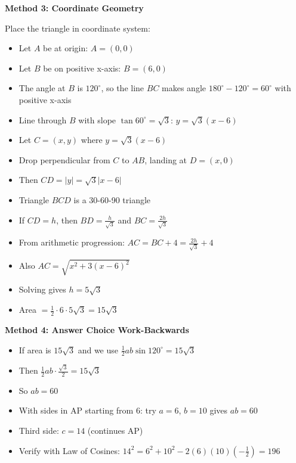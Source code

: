 \documentclass[12pt]{article}
\begin{document}
\begin{solutionbox}
\textbf{Method 3: Coordinate Geometry}

Place the triangle in coordinate system:
\begin{itemize}
    \item Let $A$ be at origin: $A = (0, 0)$
    \item Let $B$ be on positive x-axis: $B = (6, 0)$
    \item The angle at $B$ is $120^\circ$, so the line $BC$ makes angle $180^\circ - 120^\circ = 60^\circ$ with positive x-axis
    \item Line through $B$ with slope $\tan 60^\circ = \sqrt{3}$: $y = \sqrt{3}(x - 6)$
    \item Let $C = (x, y)$ where $y = \sqrt{3}(x-6)$
    \item Drop perpendicular from $C$ to $AB$, landing at $D = (x, 0)$
    \item Then $CD = |y| = \sqrt{3}|x-6|$
    \item Triangle $BCD$ is a 30-60-90 triangle
    \item If $CD = h$, then $BD = \frac{h}{\sqrt{3}}$ and $BC = \frac{2h}{\sqrt{3}}$
    \item From arithmetic progression: $AC = BC + 4 = \frac{2h}{\sqrt{3}} + 4$
    \item Also $AC = \sqrt{x^2 + 3(x-6)^2}$
    \item Solving gives $h = 5\sqrt{3}$
    \item Area $= \frac{1}{2} \cdot 6 \cdot 5\sqrt{3} = 15\sqrt{3}$
\end{itemize}

\textbf{Method 4: Answer Choice Work-Backwards}

\begin{itemize}
    \item If area is $15\sqrt{3}$ and we use $\frac{1}{2}ab\sin 120^\circ = 15\sqrt{3}$
    \item Then $\frac{1}{2}ab \cdot \frac{\sqrt{3}}{2} = 15\sqrt{3}$
    \item So $ab = 60$
    \item With sides in AP starting from 6: try $a = 6$, $b = 10$ gives $ab = 60$ \checkmark
    \item Third side: $c = 14$ (continues AP)
    \item Verify with Law of Cosines: $14^2 = 6^2 + 10^2 - 2(6)(10)(-\frac{1}{2}) = 196$ \checkmark
\end{itemize}

\end{solutionbox}
\end{document}
